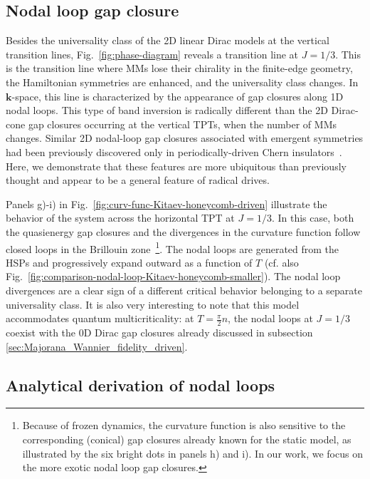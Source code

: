 \documentclass[aps,prb,twocolumn,superscriptaddress,groupedaddress]{revtex4}
\begin{document}
\subsection{Nodal loop gap closure}

Besides the universality class of the 2D linear Dirac models at the vertical transition lines, Fig.~\ref{fig:phase-diagram} reveals  a transition line  at $J=1/3$.
This is the transition line where MMs lose their chirality in the finite-edge geometry, the Hamiltonian symmetries are enhanced, and the universality class changes. 
In $\mathbf{k}$-space, this line is characterized by the appearance of gap closures along 1D nodal loops.
This type of band inversion is radically different than the 2D Dirac-cone gap closures occurring at the vertical TPTs, when the number of MMs changes.
Similar 2D nodal-loop gap closures associated with emergent symmetries had been previously discovered only in periodically-driven Chern insulators~\cite{Molignini:2019}. 
Here, we demonstrate that these features are more ubiquitous than previously thought and appear to be a general feature of radical drives.


Panels g)-i) in Fig.~\ref{fig:curv-func-Kitaev-honeycomb-driven} illustrate the behavior of the system across the horizontal TPT at $J=1/3$.
In this case, both the quasienergy gap closures and the divergences in the curvature function follow closed loops in the Brillouin zone~\footnote{Because of frozen dynamics, the curvature function is also sensitive to the corresponding (conical) gap closures already known for the static model, as illustrated by the six bright dots in panels h) and i). In our work, we focus on the more exotic nodal loop gap closures.}.
The nodal loops are generated from the HSPs and progressively expand outward as a function of $T$ (cf. also Fig.~\ref{fig:comparison-nodal-loop-Kitaev-honeycomb-smaller}).
The nodal loop divergences are a clear sign of a different critical behavior belonging to a separate universality class.
It is also very interesting to note that this model accommodates quantum multicriticality: at $T=\frac{\pi}{2}n$, the nodal loops at $J=1/3$ coexist with the 0D Dirac gap closures already discussed in subsection \ref{sec:Majorana_Wannier_fidelity_driven}.



\subsection{Analytical derivation of nodal loops}
\end{document}
